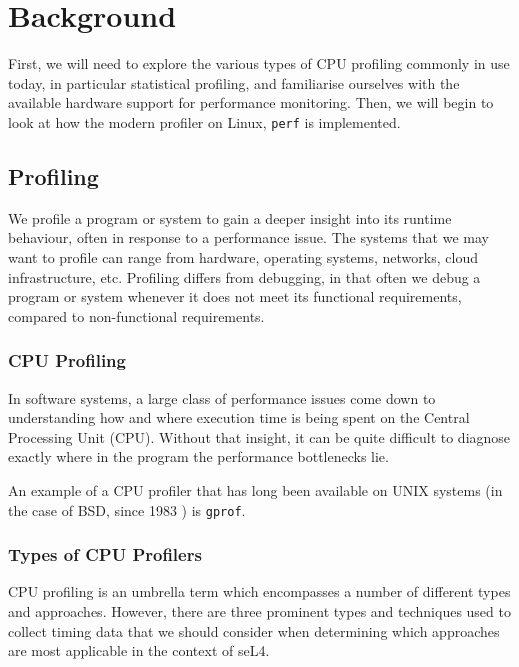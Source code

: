 \chapter{Background}\label{ch:background}

First, we will need to explore the various types of CPU profiling commonly in use today, in particular statistical profiling, and familiarise ourselves with the available hardware support for performance monitoring. Then, we will begin to look at how the modern profiler on Linux, \texttt{perf} is implemented.

\section{Profiling}

We profile a program or system to gain a deeper insight into its runtime behaviour, often in response to a performance issue. The systems that we may want to profile can range from hardware, operating systems, networks, cloud infrastructure, etc. Profiling differs from debugging, in that often we debug a program or system whenever it does not meet its functional requirements, compared to non-functional requirements.

\subsection{CPU Profiling}

In software systems, a large class of performance issues come down to understanding how and where execution time is being spent on the Central Processing Unit (CPU). Without that insight, it can be quite difficult to diagnose exactly where in the program the performance bottlenecks lie.

An example of a CPU profiler that has long been available on UNIX systems (in the case of BSD, since 1983 \cite{ManGprof}) is \texttt{gprof}.

\subsection{Types of CPU Profilers}\label{sect:cpu_profiler_types}

CPU profiling is an umbrella term which encompasses a number of different types and approaches. However, there are three prominent types and techniques used to collect timing data that we should consider when determining which approaches are most applicable in the context of seL4.

